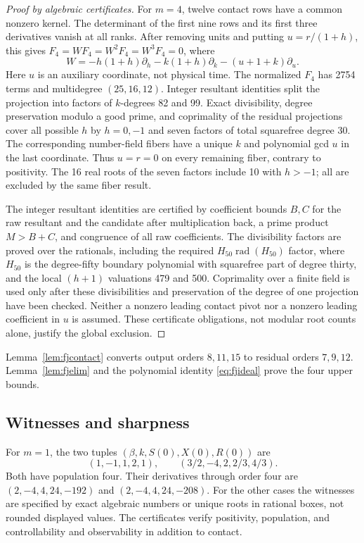 \documentclass[11pt]{article}
\theoremstyle{remark}\newtheorem{remark}[theorem]{Remark}
\begin{document}
\begin{proof}[Proof by algebraic certificates]
For $m=4$, twelve contact rows have a common nonzero kernel.
The determinant of the first nine rows and its first three derivatives
vanish at all ranks. After removing units and putting $u=r/(1+h)$,
this gives $F_4=WF_4=W^2F_4=W^3F_4=0$, where
\[
 W=-h(1+h)\partial_h-k(1+h)\partial_k-(u+1+k)\partial_u.
\]
Here $u$ is an auxiliary coordinate, not physical time.
The normalized $F_4$ has 2754 terms and multidegree $(25,16,12)$.
Integer resultant identities split the projection into factors of
$k$-degrees 82 and 99. Exact divisibility, degree preservation modulo a
good prime, and coprimality of the residual projections cover all possible
$h$ by $h=0,-1$ and seven factors of total squarefree degree 30.
The corresponding number-field fibers have a unique $k$ and polynomial
gcd $u$ in the last coordinate. Thus $u=r=0$ on every remaining fiber,
contrary to positivity. The 16 real roots of the seven factors include
10 with $h>-1$; all are excluded by the same fiber result.

The integer resultant identities are certified by coefficient bounds
$B,C$ for the raw resultant and the candidate after multiplication back,
a prime product $M>B+C$, and congruence of all raw coefficients.
The divisibility factors are proved over the rationals, including the
required $H_{50}\operatorname{rad}(H_{50})$ factor, where $H_{50}$
is the degree-fifty boundary polynomial with squarefree part of degree
thirty, and the local
$(h+1)$ valuations 479 and 500. Coprimality over a finite field is used
only after these divisibilities and preservation of the degree of one
projection have been checked. Neither a nonzero leading contact pivot
nor a nonzero leading coefficient in $u$ is assumed. These certificate
obligations, not modular root counts alone, justify the global exclusion.
\end{proof}

Lemma~\ref{lem:fjcontact} converts output orders $8,11,15$ to residual
orders $7,9,12$. Lemma~\ref{lem:fjelim} and the polynomial identity
\eqref{eq:fjideal} prove the four upper bounds.

\subsection{Witnesses and sharpness}
For $m=1$, the two tuples $(\beta,k,S(0),X(0),R(0))$ are
\[
 (1,-1,1,2,1),\qquad (3/2,-4,2,2/3,4/3).
\]
Both have population four. Their derivatives through order four are
$(2,-4,4,24,-192)$ and $(2,-4,4,24,-208)$.
For the other cases the witnesses are specified by exact algebraic
numbers or unique roots in rational boxes, not rounded displayed values.
The certificates verify positivity, population, and controllability and
observability in addition to contact.
\end{document}
